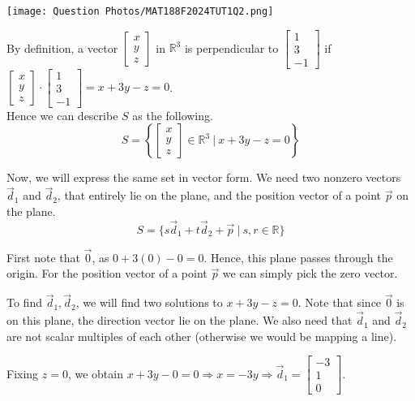 \begin{SaveQuestion}
    \begin{center}
        \texttt{[image: Question Photos/MAT188F2024TUT1Q2.png]}
    \end{center}
    By definition, a vector $\begin{bmatrix} x \\ y \\ z \end{bmatrix}$ in $\mathbb{R}^3$ is perpendicular to $\begin{bmatrix} 1 \\ 3 \\ -1 \end{bmatrix}$ if $\begin{bmatrix} x \\ y \\ z \end{bmatrix} \cdot \begin{bmatrix} 1 \\ 3 \\ -1 \end{bmatrix} = x+3y-z=0$. \\
    Hence we can describe $S$ as the following\PullLS*[1].
$$S = \left\{\begin{bmatrix} x \\ y \\ z \end{bmatrix} \in \mathbb{R}^3 \ | \ x+3y-z=0\right\}$$
    
    Now, we will express the same set in vector form. We need two nonzero vectors $\vec d_1$ and $\vec d_2$, that entirely lie on the plane, and the position vector of a point $\vec p$ on the plane.
    $$S = \{s\vec d_1 + t\vec d_2 + \vec p \ | \ s,r \in \mathbb{R}\}$$

    First note that $\vec 0$, as $0 + 3(0) - 0 = 0$. Hence, this plane passes through the origin.   For the position vector of a point $\vec p$ we can simply pick the zero vector. 

    To find $\vec d_1, \vec d_2$, we will find two solutions to $x + 3y - z = 0$. Note that since $\vec 0$ is on this plane, the direction vector lie on the plane. We also need that $\vec d_1$ and $\vec d_2$ are not scalar multiples of each other (otherwise we would be mapping a line). 
    
    Fixing $z = 0$, we obtain $x + 3y - 0 = 0 \Longrightarrow x = -3y \Longrightarrow \vec d_1 = \begin{bmatrix} -3 \\ 1 \\ 0 \end{bmatrix}$.
    

\end{SaveQuestion}
